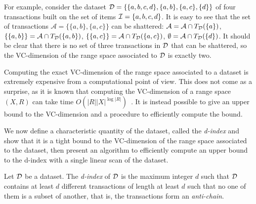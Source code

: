 For example, consider the dataset ${\cal D}=\{\{a,b,c,d\},\{a,b\},\{a,c\},\{d\}\}$ of
four transactions built on the set of items ${\cal I}=\{a,b,c,d\}$. It is easy to see
that the set of transactions $\mathcal{A}=\{\{a,b\},\{a,c\}\}$ can be shattered:
$\mathcal{A}=\mathcal{A}\cap T_{\cal D}(\{a\})$, $\{\{a,b\}\}=\mathcal{A}\cap
T_{\cal D}(\{a,b\})$, $\{\{a,c\}\}=\mathcal{A}\cap T_{\cal D}(\{a,c\})$,
$\emptyset=\mathcal{A}\cap T_{\cal D}(\{d\})$. It should be clear that there is no
set of three transactions in ${\cal D}$ that can be shattered, so the VC-dimension of
the range space associated to ${\cal D}$ is exactly two.

Computing the exact VC-dimension of the range space associated to a dataset is
extremely expensive from a computational point of view. This does not come as a
surprise, as it is known that computing the VC-dimension of a range space $(X,R)$
can take time $O(|R||X|^{\log|R|})$~\cite[Thm.~4.1]{LinialMR91}. It is instead
possible to give an upper bound to the VC-dimension and a procedure to
efficiently compute the bound.

We now define a characteristic quantity of the dataset, called the
\emph{d-index} and show that it is a tight bound to the VC-dimension of the
range space associated to the dataset, then present an algorithm to efficiently
compute an upper bound to the d-index with a single linear scan of the dataset.

\begin{definition}\label{def:vcminedindex}
  Let ${\cal D}$ be a dataset. The \emph{d-index} of ${\cal D}$ is the maximum integer $d$
  such that ${\cal D}$ contains at least $d$ different transactions of length at
  least $d$ such that no one of them is a subset of another,
  that is, the transactions form an \emph{anti-chain}.
\end{definition}

